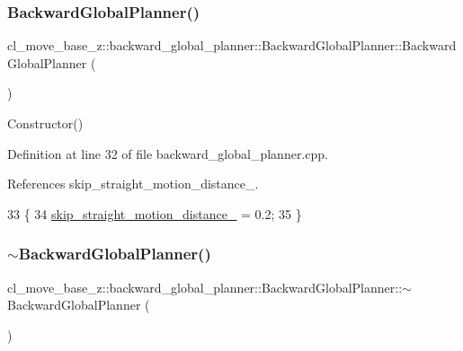 \subsubsection{\texorpdfstring{Backward\+Global\+Planner()}{BackwardGlobalPlanner()}}
{\footnotesize\ttfamily cl\+\_\+move\+\_\+base\+\_\+z\+::backward\+\_\+global\+\_\+planner\+::\+Backward\+Global\+Planner\+::\+Backward\+Global\+Planner (\begin{DoxyParamCaption}{ }\end{DoxyParamCaption})}

Constructor() 

Definition at line 32 of file backward\+\_\+global\+\_\+planner.\+cpp.



References skip\+\_\+straight\+\_\+motion\+\_\+distance\+\_\+.


\begin{DoxyCode}
33 \{
34     \hyperlink{classcl__move__base__z_1_1backward__global__planner_1_1BackwardGlobalPlanner_a045290b931b816b84ced2cfb6c39fcce}{skip\_straight\_motion\_distance\_} = 0.2;
35 \}
\end{DoxyCode}
\mbox{\label{classcl__move__base__z_1_1backward__global__planner_1_1BackwardGlobalPlanner_a2011b04d7fd3fa18ab940779ee6d6d8c}} 
\subsubsection{\texorpdfstring{$\sim$\+Backward\+Global\+Planner()}{~BackwardGlobalPlanner()}}
{\footnotesize\ttfamily cl\+\_\+move\+\_\+base\+\_\+z\+::backward\+\_\+global\+\_\+planner\+::\+Backward\+Global\+Planner\+::$\sim$\+Backward\+Global\+Planner (\begin{DoxyParamCaption}{ }\end{DoxyParamCaption})\hspace{0.3cm}{\ttfamily [virtual]}}



